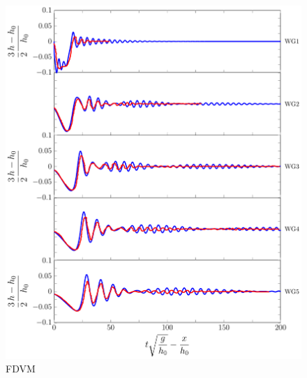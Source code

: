 \begin{figure}
	\centering
	\includegraphics[width=\textwidth]{./chp6/figures/Experiment/Segur/LongWGsFDVM1cm.pdf}
	\caption{FDVM}
	\label{fig:Segur1cmFDVM}
\end{figure}          


